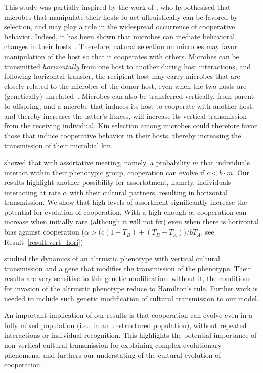 \documentclass[12pt]{extarticle}
\begin{document}
{This study was partially inspired by the work of \citet{lewin2017microbes}, 
who hypothesised that microbes that manipulate their hosts to act altruistically can be favored by selection, and may play a role in the widespread occurrence of cooperative behavior. Indeed, it has been shown that microbes can mediate behavioral changes in their hosts~\citep{dobson1988population,poulin2010parasite}. Therefore, natural selection on microbes may favor manipulation of the host so that it cooperates with others. Microbes can be transmitted \emph{horizontally} from one host to another during host interactions, and following horizontal transfer, the recipient host may carry microbes that are closely related to the microbes of the donor host, even when the two hosts are (genetically) unrelated~\citep{lewin2017microbes}. Microbes can also be transferred vertically, from parent to offspring, and %
a microbe that induces its host to cooperate with another host, and thereby increases the latter's fitness, will  increase its vertical transmission  from the receiving individual. Kin selection among microbes could therefore favor those that induce cooperative behavior in their hosts, thereby increasing the transmission of their microbial kin.

\citet{Eshel1982} showed that with assortative meeting, namely, a probability $m$ that individuals interact  within their phenotypic group, cooperation can evolve if $c < b \cdot m$.
Our results highlight another possibility for assortatment, namely, individuals interacting at rate $\alpha$ with their cultural partners, resulting in horizontal transmission.
We show that high levels of assortment  significantly increase the potential for evolution of cooperation. With a high enough $\alpha$, cooperation can increase when initially rare (although it will not fix) even when there is horizontal bias against cooperation ($\alpha > \big(c(1-T_B) + (T_B-T_A)\big) / b T_A$, see Result~\autoref{result:vert_hori})

\citet{feldman1985gene} studied the dynamics of an altruistic phenotype with vertical cultural transmission and a gene that modifies the transmission of the phenotype. Their results are very sensitive to this genetic modification: without it, the conditions for invasion of the altruistic phenotype reduce to Hamilton's rule.
Further work is needed to include such genetic modification of cultural transmission to our model.

An important implication of our results is that cooperation can evolve even in a fully mixed population (i.e., in an unstructured population), without repeated interactions or individual recognition.
This highlights the potential importance of non-vertical cultural transmission for explaining complex evolutionary phenomena, and  furthers our understating of the cultural evolution of cooperation. 

}
\end{document}
